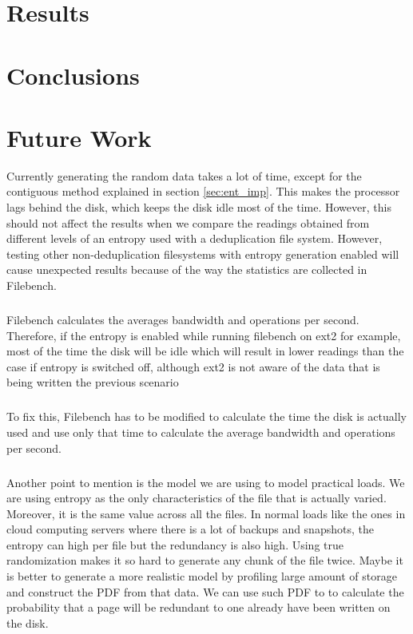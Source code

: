 \chapter{Results}\label{chap:res}
\chapter{Conclusions}\label{chap:conc}
\chapter{Future Work}\label{chap:fut}


Currently generating the random data takes a lot of time, except for the contiguous method explained in section \ref{sec:ent_imp}.
This makes the processor lags behind the disk, which keeps the disk idle most of the time.
 However, this should not affect the results when we compare the readings obtained from different levels of an entropy used with a deduplication file system.
 However, testing other non-deduplication filesystems with entropy generation enabled will cause unexpected results because of the way the statistics are collected in Filebench.
\paragraph{}
 Filebench calculates the averages bandwidth and operations per second.
 Therefore, if the entropy is enabled while running filebench on ext2 for example, most of the time the disk will be idle which will result in lower readings than the case if entropy is switched off, although ext2 is not aware of the data that is being written the previous scenario 
\paragraph{}
To fix this, Filebench has to be modified to calculate the time the disk is actually used and use only that time to calculate the average bandwidth and operations per second.
\paragraph{}
Another point to mention is the model we are using to model practical loads. We are using entropy as the only characteristics of the file that is actually varied.
 Moreover, it is the same value across all the files. In normal loads like the ones in cloud computing servers where there is a lot of backups and snapshots, the entropy can high per file but the redundancy is also high.
 Using true randomization makes it so hard to generate any chunk of the file twice.
 Maybe it is better to generate a more realistic model by profiling large amount of storage and construct the PDF from that data. We can use such PDF to to calculate the probability that a page will be redundant to one already have been written on the disk.
